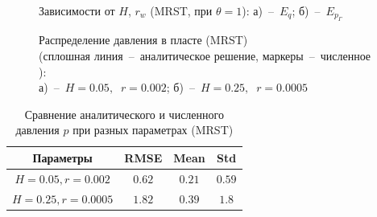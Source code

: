 \documentclass{article}
\begin{document}
\begin{figure}[!ht]
\centering
\begin{subfigure}{0.48\textwidth}
\centering

\caption{}
\label{fig:kham_hw_outer_eq_map_mrst}
\end{subfigure}
\hfill
\begin{subfigure}{0.48\textwidth}
\centering

\caption{}
\label{fig:kham_hw_outer_epg_map_mrst}
\end{subfigure}
\caption{
Зависимости от $H$, $r_w$ (MRST, при $\theta = 1$):
а)~--~$E_q$;
б)~--~$E_{p_{\Gamma}}$
}
\label{fig:kham_hw_outer_eq_epg_maps_mrst}
\end{figure}

\begin{figure}[!ht]
\centering
\begin{subfigure}{0.48\textwidth}
\centering

\caption{}
\label{fig:kham_hw_outer_p_worst_pg_mrst}
\end{subfigure}
\hfill
\begin{subfigure}{0.48\textwidth}
\centering

\caption{}
\label{fig:kham_hw_outer_p_best_pg_mrst}
\end{subfigure}
\caption{
Распределение давления в пласте (MRST) \\
(сплошная линия~--~аналитическое решение, маркеры~--~численное ): \\
а)~--~$H = 0.05, \;\; r = 0.002$;
б)~--~$H = 0.25, \;\; r = 0.0005$
}
\label{fig:kham_hw_outer_press_disrt}
\end{figure}

\begin{table}[h!]
\centering
\caption{Сравнение аналитического и численного давления $p$ при разных параметрах (MRST)}
\label{tab:kham_hw_outer_p_error_metrics_mrst}
\begin{tabular}{|c|c|c|c|}
\hline
\textbf{Параметры} & \textbf{RMSE} & \textbf{Mean} & \textbf{Std} \\
\hline
$H=0.05, r=0.002$ & $0.62$ & $0.21$ & $0.59$ \\
\hline
$H=0.25, r=0.0005$ & $1.82$ & $0.39$ & $1.8$ \\
\hline
\end{tabular}
\end{table}
\end{document}
